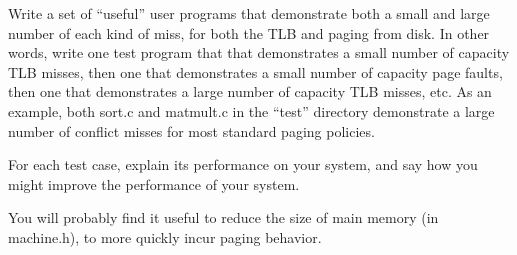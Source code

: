 \begin{description}
Write a set of ``useful'' user programs that demonstrate
both a small and large number of each kind of miss, for both the TLB and paging
from disk.  In other words, write one test program that
that demonstrates a small number of capacity TLB misses, then one that 
demonstrates a small number of capacity page faults, then one that 
demonstrates a large number of capacity TLB misses, etc.
As an example, both sort.c and matmult.c in the ``test'' directory
demonstrate a large number of conflict misses for most standard paging policies.

For each test case, explain its performance on your system, and say how 
you might improve the performance of your system.

You will probably find it useful to reduce the size of main memory
(in machine.h), to more quickly incur paging behavior.
\end{description}


